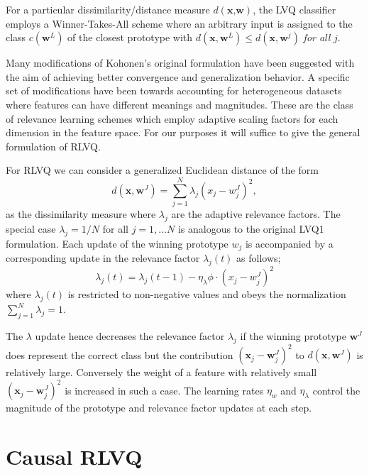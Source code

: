 \documentclass{esannV2}
\begin{document}
For a particular dissimilarity/distance measure $d(\textbf{x,w})$, the LVQ classifier employs a Winner-Takes-All scheme where an arbitrary input is assigned to the class $c(\textbf{w}^L)$ of the closest prototype with $d(\textbf{x},\textbf{w}^L) \leq d(\textbf{x},\textbf{w}^j)$ \textsl{for all} $j$.

Many modifications of Kohonen's original formulation \cite{02} have been suggested with the aim of achieving better convergence and generalization behavior. A specific set of modifications have been towards accounting for heterogeneous datasets where features can have different meanings and magnitudes. These are the class of relevance learning schemes which employ adaptive scaling factors for each dimension in the feature space. For our purposes it will suffice to give the general formulation of RLVQ.

For RLVQ we can consider a generalized Euclidean distance of the form
%
\begin{equation} 
d(\textbf{x},\textbf{w}^J) = \sum^N_{j=1} \lambda_j (x_j - w^J_j)^2 ,
\end{equation}
%
\noindent
as the dissimilarity measure where $\lambda_j$ are the adaptive relevance factors. The special case $\lambda_j = 1/N$ for all $j = 1,\ldots N$ is analogous to the original LVQ1 formulation. Each update of the winning prototype $w_j$ is accompanied by a corresponding update in the relevance factor $\lambda_j(t)$ as follows;
%
\begin{equation}
\lambda_j(t) = \lambda_j(t-1) - \eta_\lambda \phi \cdot (x_j - w^J_j)^2 
\end{equation}
%
where $\lambda_j(t)$ is restricted to non-negative values and obeys the normalization $\sum^N_{j=1} \lambda_j = 1$.

The $\lambda$ update hence decreases the relevance factor $\lambda_j$ if the winning prototype $\textbf{w}^J$ does represent the correct class but the contribution $(\textbf{x}_j - \textbf{w}^J_j)^2$ to $d(\textbf{x},\textbf{w}^J)$ is relatively large. Conversely the weight of a feature with relatively small $(\textbf{x}_j - \textbf{w}^J_j)^2$ is increased in such a case. The learning rates $\eta_w$ and $\eta_\lambda$ control the magnitude of the prototype and relevance factor updates at each step.

\section{Causal RLVQ}
\label{sec:CRLVQ}
\end{document}
